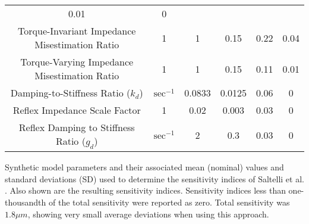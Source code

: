 \documentclass[10pt]{article}
\begin{document}
\begin{table}[!ht]
\begin{tabular}{|c|c|c c|c c|}
0.01 &
0 \\
Torque-Invariant Impedance Misestimation Ratio &
1 &
1 &
0.15 &
0.22 &
0.04 \\
Torque-Varying Impedance Misestimation Ratio &
1 &
1 &
0.15 &
0.11 &
0.01 \\
Damping-to-Stiffness Ratio ($k_d$) &
$\text{sec}^{-1}$ &
0.0833 &
0.0125 &
0.06 &
0 \\
Reflex Impedance Scale Factor &
1 &
0.02 &
0.003 &
0.03 &
0 \\
Reflex Damping to Stiffness Ratio ($g_d$) &
$\text{sec}^{-1}$ &
2 &
0.3 &
0.03 &
0 \\ \hline
\end{tabular}
\begin{flushleft}Synthetic model parameters and their associated mean (nominal) values and standard deviations (SD) used to determine the sensitivity indices of Saltelli et al. \cite{saltelli2010variance}. Also shown are the resulting sensitivity indices. Sensitivity indices less than one-thousandth of the total sensitivity were reported as zero. Total sensitivity was $1.8 \mu m$, showing very small average deviations when using this approach.
\end{flushleft}
\label{tab:parameters}
\end{table}
\end{document}
